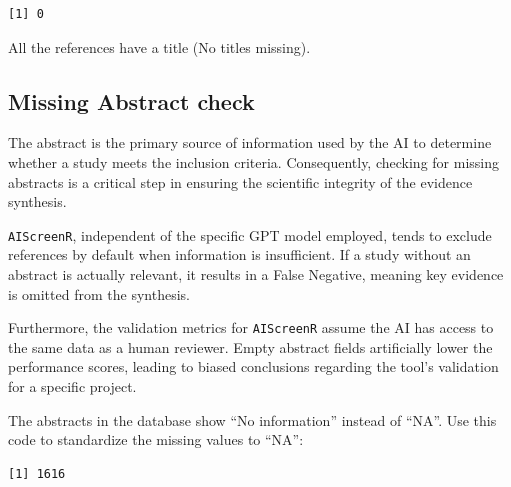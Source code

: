 \documentclass[
  letterpaper,
  DIV=11,
  numbers=noendperiod]{scrartcl}
\newenvironment{Shaded}{\begin{snugshade}}{\end{snugshade}}
\newcommand{\AttributeTok}[1]{\textcolor[rgb]{0.40,0.45,0.13}{#1}}
\newcommand{\CommentTok}[1]{\textcolor[rgb]{0.37,0.37,0.37}{#1}}
\newcommand{\ConstantTok}[1]{\textcolor[rgb]{0.56,0.35,0.01}{#1}}
\newcommand{\FunctionTok}[1]{\textcolor[rgb]{0.28,0.35,0.67}{#1}}
\newcommand{\NormalTok}[1]{\textcolor[rgb]{0.00,0.23,0.31}{#1}}
\newcommand{\SpecialCharTok}[1]{\textcolor[rgb]{0.37,0.37,0.37}{#1}}
\newcommand{\StringTok}[1]{\textcolor[rgb]{0.13,0.47,0.30}{#1}}
\begin{document}
\begin{Shaded}
\end{Shaded}

\begin{verbatim}
[1] 0
\end{verbatim}

All the references have a title (No titles missing).

\subsection{Missing Abstract check}\label{missing-abstract-check}

The abstract is the primary source of information used by the AI to
determine whether a study meets the inclusion criteria. Consequently,
checking for missing abstracts is a critical step in ensuring the
scientific integrity of the evidence synthesis.

\texttt{AIScreenR}, independent of the specific GPT model employed,
tends to exclude references by default when information is insufficient.
If a study without an abstract is actually relevant, it results in a
False Negative, meaning key evidence is omitted from the synthesis.

Furthermore, the validation metrics for \texttt{AIScreenR} assume the AI
has access to the same data as a human reviewer. Empty abstract fields
artificially lower the performance scores, leading to biased conclusions
regarding the tool's validation for a specific project.

The abstracts in the database show ``No information'' instead of ``NA''.
Use this code to standardize the missing values to ``NA'':

\begin{Shaded}
\end{Shaded}

\begin{verbatim}
[1] 1616
\end{verbatim}
\end{document}
